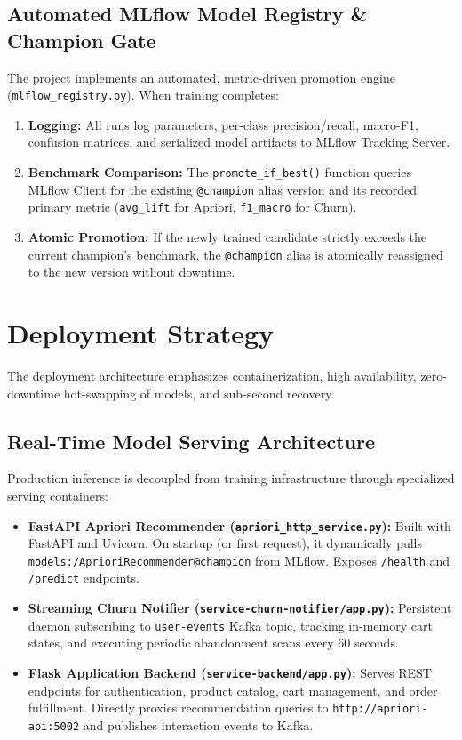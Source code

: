 \documentclass[11pt,a4paper]{article}
\begin{document}
\subsection{Automated MLflow Model Registry \& Champion Gate}
The project implements an automated, metric-driven promotion engine (\texttt{mlflow\_registry.py}). When training completes:
\begin{enumerate}
    \item \textbf{Logging:} All runs log parameters, per-class precision/recall, macro-F1, confusion matrices, and serialized model artifacts to MLflow Tracking Server.
    \item \textbf{Benchmark Comparison:} The \texttt{promote\_if\_best()} function queries MLflow Client for the existing \texttt{@champion} alias version and its recorded primary metric (\texttt{avg\_lift} for Apriori, \texttt{f1\_macro} for Churn).
    \item \textbf{Atomic Promotion:} If the newly trained candidate strictly exceeds the current champion's benchmark, the \texttt{@champion} alias is atomically reassigned to the new version without downtime.
\end{enumerate}

\section{Deployment Strategy}

The deployment architecture emphasizes containerization, high availability, zero-downtime hot-swapping of models, and sub-second recovery.

\subsection{Real-Time Model Serving Architecture}
Production inference is decoupled from training infrastructure through specialized serving containers:
\begin{itemize}
    \item \textbf{FastAPI Apriori Recommender (\texttt{apriori\_http\_service.py}):} Built with FastAPI and Uvicorn. On startup (or first request), it dynamically pulls \texttt{models:/AprioriRecommender@champion} from MLflow. Exposes \texttt{/health} and \texttt{/predict} endpoints.
    \item \textbf{Streaming Churn Notifier (\texttt{service-churn-notifier/app.py}):} Persistent daemon subscribing to \texttt{user-events} Kafka topic, tracking in-memory cart states, and executing periodic abandonment scans every 60 seconds.
    \item \textbf{Flask Application Backend (\texttt{service-backend/app.py}):} Serves REST endpoints for authentication, product catalog, cart management, and order fulfillment. Directly proxies recommendation queries to \texttt{http://apriori-api:5002} and publishes interaction events to Kafka.
\end{itemize}
\end{document}
